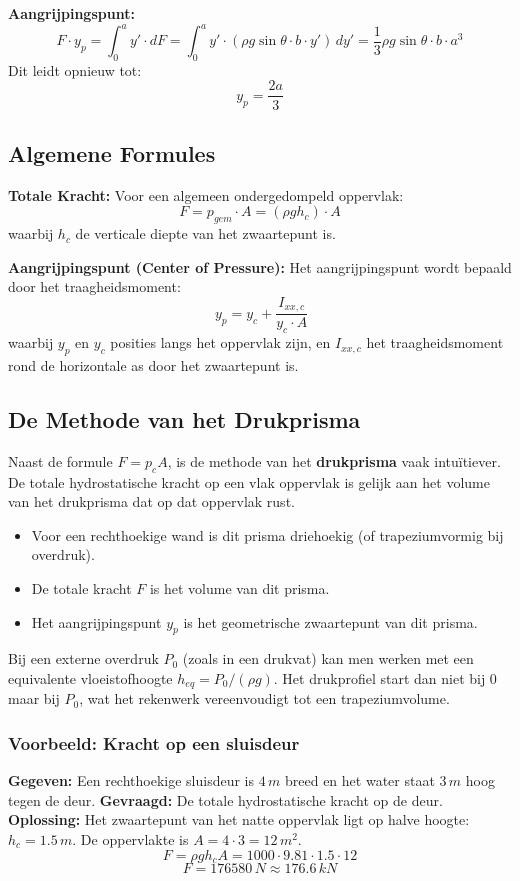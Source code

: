 \documentclass[a4paper,11pt,twoside]{report}
\newcommand{\term}[1]{\textbf{#1}}
\begin{document}
\textbf{Aangrijpingspunt:}
\[
F \cdot y_p = \int_0^a y' \cdot dF = \int_0^a y' \cdot (\rho g \sin \theta \cdot b \cdot y') \, dy' = \frac{1}{3} \rho g \sin \theta \cdot b \cdot a^3
\]
Dit leidt opnieuw tot:
\[
y_p = \frac{2a}{3}
\]

\subsection{Algemene Formules}
\textbf{Totale Kracht:}
Voor een algemeen ondergedompeld oppervlak:
\[
F = p_{gem} \cdot A = (\rho g h_c) \cdot A
\]
waarbij $h_c$ de verticale diepte van het zwaartepunt is.

\textbf{Aangrijpingspunt (Center of Pressure):}
Het aangrijpingspunt wordt bepaald door het traagheidsmoment:
\[\
y_p = y_c + \frac{I_{xx,c}}{y_c \cdot A}
\]
waarbij $y_p$ en $y_c$ posities langs het oppervlak zijn, en $I_{xx,c}$ het traagheidsmoment rond de horizontale as door het zwaartepunt is.

\subsection{De Methode van het Drukprisma}
Naast de formule $F = p_c A$, is de methode van het \term{drukprisma} vaak intuïtiever. De totale hydrostatische kracht op een vlak oppervlak is gelijk aan het volume van het drukprisma dat op dat oppervlak rust.
\begin{itemize}
    \item Voor een rechthoekige wand is dit prisma driehoekig (of trapeziumvormig bij overdruk).
    \item De totale kracht $F$ is het volume van dit prisma.
    \item Het aangrijpingspunt $y_p$ is het geometrische zwaartepunt van dit prisma.
\end{itemize}
Bij een externe overdruk $P_0$ (zoals in een drukvat) kan men werken met een equivalente vloeistofhoogte $h_{eq} = P_0 / (\rho g)$. Het drukprofiel start dan niet bij 0 maar bij $P_0$, wat het rekenwerk vereenvoudigt tot een trapeziumvolume.

\subsubsection*{Voorbeeld: Kracht op een sluisdeur}
\textbf{Gegeven:} Een rechthoekige sluisdeur is $4 \, m$ breed en het water staat $3 \, m$ hoog tegen de deur.
\textbf{Gevraagd:} De totale hydrostatische kracht op de deur.
\textbf{Oplossing:}
Het zwaartepunt van het natte oppervlak ligt op halve hoogte: $h_c = 1.5 \, m$.
De oppervlakte is $A = 4 \cdot 3 = 12 \, m^2$.
\[
F = \rho g h_c A = 1000 \cdot 9.81 \cdot 1.5 \cdot 12
\]
\[
F = 176580 \, N \approx 176.6 \, kN
\]
\end{document}
